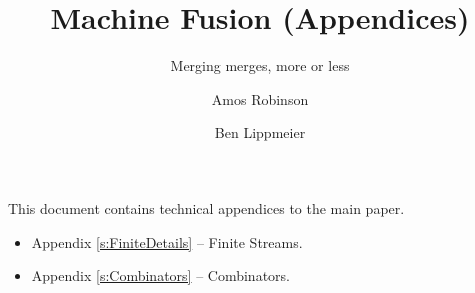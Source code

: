 \documentclass[sigconf,review]{acmart}
\begin{document}
\title{Machine Fusion (Appendices)}
\subtitle{Merging merges, more or less}

\author{Amos Robinson}

\author{Ben Lippmeier}

\makeatactive
\maketitle

\appendix

\vspace{5em}
This document contains technical appendices to the main paper.
\begin{itemize}
\item Appendix \ref{s:FiniteDetails} -- Finite Streams.
\item Appendix \ref{s:Combinators}   -- Combinators.
\end{itemize}


\clearpage{}


% 
\end{document}

